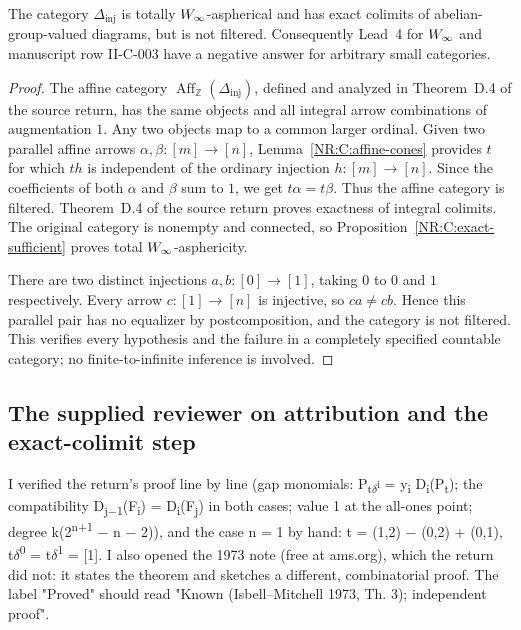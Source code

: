 \begin{nrtheorem}\label{NR:C:counterexample}
The category $\Delta_{\mathrm{inj}}$ is totally $W_\infty$-aspherical and has exact colimits of abelian-group-valued diagrams, but is not filtered. Consequently Lead~4 for $W_\infty$ and manuscript row II-C-003 have a negative answer for arbitrary small categories.
\end{nrtheorem}
\begin{proof}
The affine category $\operatorname{Aff}_{\mathbb Z}(\Delta_{\mathrm{inj}})$, defined and analyzed in Theorem~D.4 of the source return, has the same objects and all integral arrow combinations of augmentation $1$. Any two objects map to a common larger ordinal. Given two parallel affine arrows $\alpha,\beta:[m]\to[n]$, Lemma~\ref{NR:C:affine-cones} provides $t$ for which $th$ is independent of the ordinary injection $h:[m]\to[n]$. Since the coefficients of both $\alpha$ and $\beta$ sum to $1$, we get $t\alpha=t\beta$. Thus the affine category is filtered. Theorem~D.4 of the source return proves exactness of integral colimits. The original category is nonempty and connected, so Proposition~\ref{NR:C:exact-sufficient} proves total $W_\infty$-asphericity.

There are two distinct injections $a,b:[0]\to[1]$, taking $0$ to $0$ and $1$ respectively. Every arrow $c:[1]\to[n]$ is injective, so $ca\ne cb$. Hence this parallel pair has no equalizer by postcomposition, and the category is not filtered. This verifies every hypothesis and the failure in a completely specified countable category; no finite-to-infinite inference is involved.
\end{proof}


\subsection*{The supplied reviewer on attribution and the exact-colimit step}
I verified the return's proof line by line (gap monomials: P\textsubscript{t\ensuremath{\delta}\textsuperscript{i}} = y\textsubscript{i} D\textsubscript{i}(P\textsubscript{t}); the compatibility D\textsubscript{j\ensuremath{-}1}(F\textsubscript{i}) = D\textsubscript{i}(F\textsubscript{j}) in both cases; value 1 at the all-ones point; degree k(2\textsuperscript{n+1} \ensuremath{-} n \ensuremath{-} 2)), and the case n = 1 by hand: t = (1,2) \ensuremath{-} (0,2) + (0,1), t\ensuremath{\delta}\textsuperscript{0} = t\ensuremath{\delta}\textsuperscript{1} = [1]. I also opened the 1973 note (free at ams.org), which the return did not: it states the theorem and sketches a different, combinatorial proof. The label "Proved" should read "Known (Isbell--Mitchell 1973, Th. 3); independent proof".

